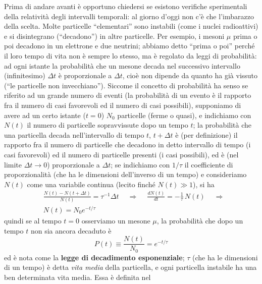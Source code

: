 Prima di andare avanti \`e opportuno chiedersi se esistono verifiche
sperimentali della relativit\`a degli intervalli temporali: al giorno d'oggi non
c'\`e che l'imbarazzo della scelta. Molte particelle ``elementari'' sono
instabili (come i nuclei radioattivi) e si disintegrano (``decadono'') in altre
particelle. Per esempio, i mesoni $\mu$ prima o poi decadono in un elettrone e
due neutrini; abbiamo detto ``prima o poi'' perch\'e il loro tempo di vita non
\`e sempre lo stesso, ma \`e regolato da leggi di probabilit\`a: ad ogni istante
la probabilit\`a che un mesone decada nel successivo intervallo (infinitesimo)
$\Delta t$ \`e proporzionale a $\Delta t$, cio\`e non dipende da quanto ha gi\`a
vissuto (``le particelle non invecchiano''). Siccome il concetto di
probabilit\`a ha senso se riferito ad un grande numero di eventi (la
probabilit\`a di un evento \`e il rapporto fra il numero di casi favorevoli ed
il numero di casi possibili), supponiamo di avere ad un certo istante ($t=0$)
$N_0$ particelle (ferme o quasi), e indichiamo con $N(t)$ il numero di
particelle sopravvissute dopo un tempo $t$; la probabilit\`a che una particella
decada nell'intervallo di tempo $t$, $t+\Delta t$ \`e (per definizione) il
rapporto fra il numero di particelle che decadono in detto intervallo di tempo
(i casi favorevoli) ed il numero di particelle presenti (i casi possibili), ed
\`e (nel limite $\Delta t\to0$) proporzionale a $\Delta t$; se indichiamo con
$1/\tau$ il coefficiente di proporzionalit\`a (che ha le dimensioni dell'inverso
di un tempo) e consideriamo $N(t)$ come una variabile continua (lecito finch\'e
$N(t)\gg1$), si ha
\begin{equation}
  \begin{split}
    &\frac{N(t)-N(t+\Delta t)}{N(t)}=\tau^{-1}\Delta t\quad\ \Rightarrow
    \quad\ \frac{dN(t)}{dt}=-\frac1\tau\,N(t)\quad\ \Rightarrow\\
    &N(t)=N_0e^{-t/\tau}
  \end{split}
  \tag{4.11}
\end{equation}
quindi se al tempo $t=0$ osserviamo un mesone $\mu$, la probabilit\`a che dopo
un tempo $t$ non sia ancora decaduto \`e
\begin{equation}
  P(t)\equiv\frac{N(t)}{N_0}=e^{-t/\tau}
  \tag{4.12}
\end{equation}
ed \`e nota come la \textbf{legge di decadimento esponenziale}; $\tau$ (che ha
le dimensioni di un tempo) \`e detta \emph{vita media} della particella, e ogni
particella instabile ha una ben determinata vita media. Essa \`e definita nel
